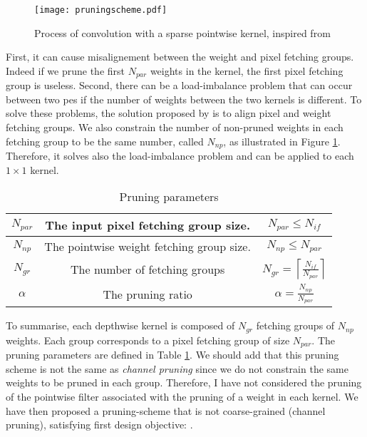 \begin{figure}
    \centering
    \texttt{[image: pruningscheme.pdf]}
    \caption{Process of convolution with a sparse pointwise kernel, inspired from \cite{kang_accelerator-aware_2020}}
    \label{fig:prunedwg}
\end{figure}
%
First, it can cause misalignement between the weight and pixel fetching groups. Indeed if we prune the first $N_{par}$ weights in the kernel, the first pixel fetching group is useless. Second, there can be a load-imbalance problem that can occur between two \acrshort{pe}s if the number of weights between the two kernels is different. To solve these problems, the solution proposed by \cite{kang_accelerator-aware_2020} is to align pixel and weight fetching groups. We also constrain the number of non-pruned weights in each fetching group to be the same number, called $N_{np}$, as illustrated in Figure \ref{fig:prunedwg}. Therefore, it solves also the load-imbalance problem and can be applied to each $1 \times 1$ kernel.

%
\begin{table}
    \center
    \begin{tabular}{|c|c|c|}
        \hline
        $N_{par}$ & The input pixel fetching group size. & $N_{par} \leq N_{if}$ \\
        \hline
        $N_{np}$  & The pointwise weight fetching group size. & $N_{np} \leq N_{par}$ \\
        \hline
        $N_{gr}$  & The number of fetching groups & $N_{gr} = \left\lceil \frac{N_{if}}{N_{par}} \right\rceil $ \\
        \hline
        $\alpha$  & The pruning ratio & $\alpha = \frac{N_{np}}{N_{par}}  $ \\
        \hline
    \end{tabular}
    \caption{Pruning parameters}
    \label{tab:pr_param}
\end{table}
%
To summarise, each depthwise kernel is composed of $N_{gr}$ fetching groups of $N_{np}$ weights. Each group corresponds to a pixel fetching group of size $N_{par}$. The pruning parameters are defined in Table \ref{tab:pr_param}. We should add that this pruning scheme is not the same as \textit{channel pruning} since we do not constrain the same weights to be pruned in each group. Therefore, I have not considered the pruning of the pointwise filter associated with the pruning of a weight in each kernel. We have then proposed a pruning-scheme that is not coarse-grained (channel pruning), satisfying first design objective: \textbf{}.
%
